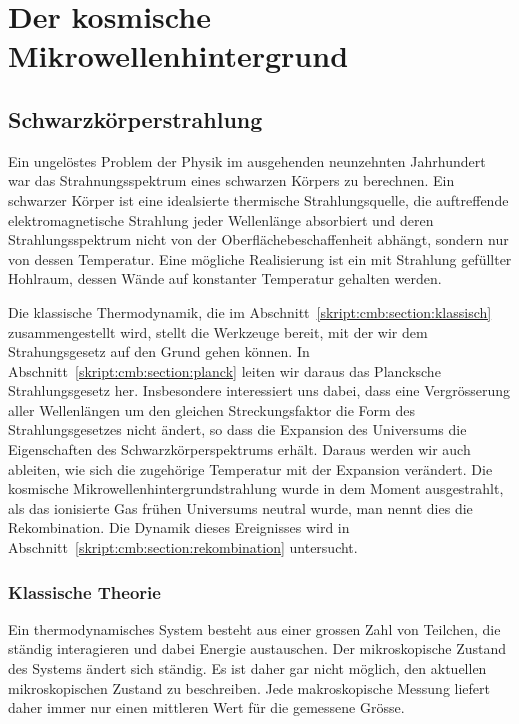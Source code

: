 %
%
%
\chapter{Der kosmische Mikrowellenhintergrund%
\label{chapter:cmb}}
\rhead{}

\section{Schwarzkörperstrahlung}
Ein ungelöstes Problem der Physik im ausgehenden neunzehnten Jahrhundert
war das Strahnungsspektrum eines schwarzen Körpers zu berechnen.
Ein schwarzer Körper ist eine idealsierte thermische Strahlungsquelle,
die auftreffende elektromagnetische Strahlung jeder Wellenlänge absorbiert
und deren Strahlungsspektrum nicht von der Oberflächebeschaffenheit
abhängt, sondern nur von dessen Temperatur.
Eine mögliche Realisierung ist ein mit Strahlung gefüllter Hohlraum, dessen
Wände auf konstanter Temperatur gehalten werden.

Die klassische Thermodynamik, die im
Abschnitt~\ref{skript:cmb:section:klassisch} zusammengestellt wird,
stellt die Werkzeuge bereit, mit der wir
dem Strahungsgesetz auf den Grund gehen können.
In Abschnitt~\ref{skript:cmb:section:planck} leiten wir daraus
das Plancksche Strahlungsgesetz her.
Insbesondere interessiert uns dabei, dass eine Vergrösserung aller
Wellenlängen um den gleichen Streckungsfaktor die Form des
Strahlungsgesetzes nicht ändert, so dass die Expansion des Universums
die Eigenschaften des Schwarzkörperspektrums erhält.
Daraus werden wir auch ableiten, wie sich die zugehörige Temperatur
mit der Expansion verändert.
Die kosmische Mikrowellenhintergrundstrahlung wurde in dem Moment
ausgestrahlt, als das ionisierte Gas frühen Universums neutral wurde,
man nennt dies die Rekombination.
Die Dynamik dieses Ereignisses wird in
Abschnitt~\ref{skript:cmb:section:rekombination} untersucht.

\subsection{Klassische Theorie%
\label{skript:cmb:section:klassisch}}
Ein thermodynamisches System besteht aus einer grossen Zahl von 
Teilchen, die ständig interagieren und dabei Energie austauschen.
Der mikroskopische Zustand des Systems ändert sich ständig.
Es ist daher gar nicht möglich, den aktuellen mikroskopischen
Zustand zu beschreiben.
Jede makroskopische Messung liefert daher immer nur einen mittleren
Wert für die gemessene Grösse.

